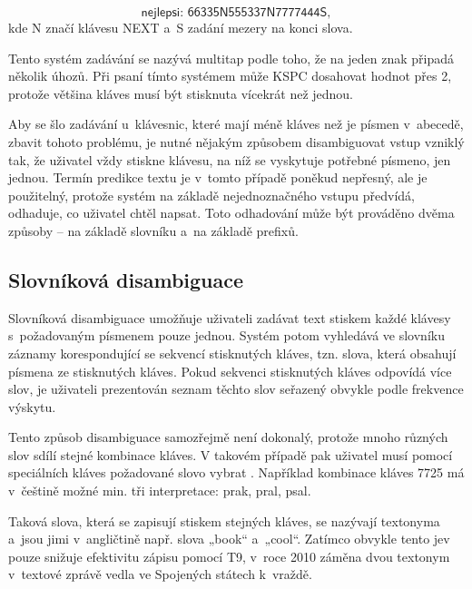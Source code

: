 \documentclass[a4paper,11pt,openany]{book} %
\newcommand\exmp{\textsf}
\begin{document}
\[
	\exmp{nejlepsi: 66335N555337N7777444S},
\]
kde \exmp{N} značí klávesu \exmp{NEXT} a~\exmp{S} zadání mezery na konci slova.

Tento systém zadávání se nazývá multitap podle toho, že na jeden znak připadá několik úhozů. Při psaní tímto systémem může KSPC dosahovat hodnot přes 2, protože většina kláves musí být stisknuta vícekrát než jednou. \parencite[202]{mackenzie2002kspc}

Aby se šlo zadávání u~klávesnic, které mají méně kláves než je písmen v~abecedě, zbavit tohoto problému, je nutné nějakým způsobem disambiguovat vstup vzniklý tak, že uživatel vždy stiskne klávesu, na níž se vyskytuje potřebné písmeno, jen jednou. Termín predikce textu je v~tomto případě poněkud nepřesný, ale je použitelný, protože systém na základě nejednoznačného vstupu předvídá, odhaduje, co uživatel chtěl napsat. Toto odhadování může být prováděno dvěma způsoby -- na základě slovníku a~na základě prefixů.

\subsection{Slovníková disambiguace}

Slovníková disambiguace umožňuje uživateli zadávat text stiskem každé klávesy s~požadovaným písmenem pouze jednou. Systém potom vyhledává ve slovníku záznamy korespondující se sekvencí stisknutých kláves, tzn. slova, která obsahují písmena ze stisknutých kláves. Pokud sekvenci stisknutých kláves odpovídá více slov, je uživateli prezentován seznam těchto slov seřazený obvykle podle frekvence výskytu. %

Tento způsob disambiguace samozřejmě není dokonalý, protože mnoho různých slov sdílí stejné kombinace kláves. V takovém případě pak uživatel musí pomocí speciálních kláves požadované slovo vybrat \parencite{MacKenzie2001}. Například kombinace kláves \exmp{7725} má v~češtině možné min. tři interpretace: \exmp{prak, pral, psal}.

Taková slova, která se zapisují stiskem stejných kláves, se nazývají textonyma \parencite{ericzorn2007} a~jsou jimi v~angličtině např. slova „book“ a~„cool“. Zatímco obvykle tento jev pouze snižuje efektivitu zápisu pomocí T9, v~roce 2010 záměna dvou textonym v~textové zprávě vedla ve Spojených státech k~vraždě. \parencite{t9kill}
\end{document}
